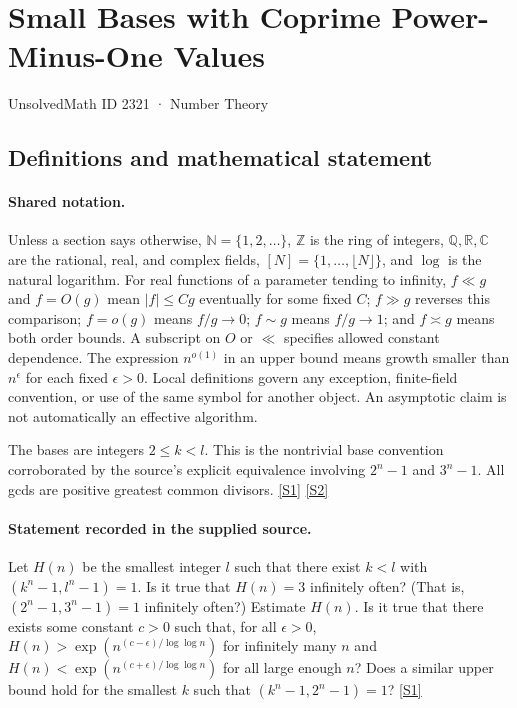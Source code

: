 \documentclass[11pt,a4paper]{article}
\newcommand{\N}{\mathbb{N}}
\newcommand{\Z}{\mathbb{Z}}
\newcommand{\Q}{\mathbb{Q}}
\newcommand{\R}{\mathbb{R}}
\newcommand{\C}{\mathbb{C}}
\newcommand{\sref}[2]{\hyperlink{source:#1:#2}{[S#2]}}
\begin{document}

\setcounter{section}{2320}

\section{Small Bases with Coprime Power-Minus-One Values}\label{2321}

{\small\sffamily UnsolvedMath ID 2321 · Number Theory}

\subsection{Definitions and mathematical statement}

\paragraph{Shared notation.}Unless a section says otherwise, $\N=\{1,2,\ldots\}$,
$\Z$ is the ring of integers, $\Q,\R,\C$ are the rational, real, and complex
fields, $[N]=\{1,\ldots,\lfloor N\rfloor\}$, and $\log$ is the natural
logarithm. For real functions of a parameter tending to infinity,
$f\ll g$ and $f=O(g)$ mean $|f|\leq Cg$ eventually for some fixed $C$;
$f\gg g$ reverses this comparison; $f=o(g)$ means $f/g\to0$;
$f\sim g$ means $f/g\to1$; and $f\asymp g$ means both order bounds.
A subscript on $O$ or $\ll$ specifies allowed constant dependence.
The expression $n^{o(1)}$ in an upper bound means growth smaller than
$n^\epsilon$ for each fixed $\epsilon>0$. Local definitions govern any
exception, finite-field convention, or use of the same symbol for another
object. An asymptotic claim is not automatically an effective algorithm.



The bases are integers $2\leq k<l$. This is the nontrivial base convention corroborated by the source's explicit equivalence involving $2^n-1$ and $3^n-1$. All gcds are positive greatest common divisors. \sref{2321}{1} \sref{2321}{2}

\paragraph{Statement recorded in the supplied source.}
Let $H(n)$ be the smallest integer $l$ such that there exist $k<l$ with $(k^n-1,l^n-1)=1$.
Is it true that $H(n)=3$ infinitely often? (That is, $(2^n-1,3^n-1)=1$ infinitely often?)
Estimate $H(n)$. Is it true that there exists some constant $c>0$ such that, for all $\epsilon>0$, $ H(n) > \exp(n^{(c-\epsilon)/\log\log n}) $ for infinitely many $n$ and $ H(n) < \exp(n^{(c+\epsilon)/\log\log n}) $ for all large enough $n$?
Does a similar upper bound hold for the smallest $k$ such that $(k^n-1,2^n-1)=1$? \sref{2321}{1}
\end{document}
